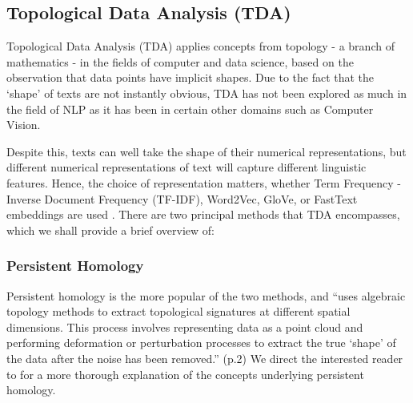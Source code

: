 \documentclass[12pt,twoside]{report}
\begin{document}
\subsection{Topological Data Analysis (TDA)}

Topological Data Analysis (TDA) applies concepts from topology - a branch of mathematics - in the fields of computer and data science, based on the observation that data points have implicit shapes. \cite{savle-etal-2019-topological} Due to the fact that the `shape' of texts are not instantly obvious, TDA has not been explored as much in the field of NLP as it has been in certain other domains such as Computer Vision. \cite{uchendu2024unveilingtopologicalstructurestext} \newline \par

Despite this, texts can well take the shape of their numerical representations, but different numerical representations of text will capture different linguistic features. Hence, the choice of representation matters, whether Term Frequency - Inverse Document Frequency (TF-IDF), Word2Vec, GloVe, or FastText embeddings are used \cite{uchendu2024unveilingtopologicalstructurestext}. There are two principal methods that TDA encompasses, which we shall provide a brief overview of:
\vspace{-10pt}
\subsubsection{Persistent Homology}
Persistent homology is the more popular of the two methods, and ``uses algebraic topology methods to extract topological signatures at different spatial dimensions. This process involves representing data as a point cloud and performing deformation or perturbation processes to extract the true `shape' of the data after the noise has been removed.'' \cite{uchendu2024unveilingtopologicalstructurestext} (p.2) We direct the interested reader to \cite{uchendu2024unveilingtopologicalstructurestext} for a more thorough explanation of the concepts underlying persistent homology. \newline \par 
\end{document}
